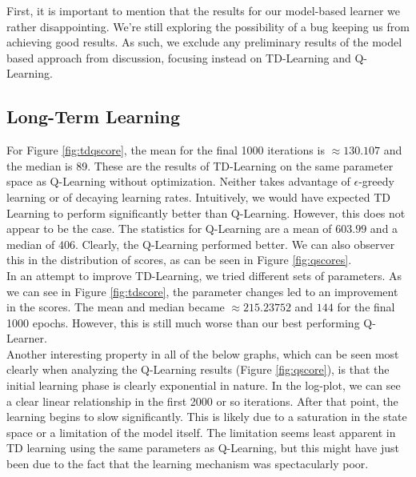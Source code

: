 \documentclass[letterpaper]{article}
\begin{document}
First, it is important to mention that the results for our model-based learner we rather disappointing. We're still exploring the possibility of a bug keeping us from achieving good results. As such, we exclude any preliminary results of the model based approach from discussion, focusing instead on TD-Learning and Q-Learning.

\subsection{Long-Term Learning}
For Figure \ref{fig:tdqscore}, the mean for the final 1000 iterations is $\approx 130.107$ and the median is 89. These are the results of TD-Learning on the same parameter space as Q-Learning without optimization. Neither takes advantage of $\epsilon$-greedy learning or of decaying learning rates. Intuitively, we would have expected TD Learning to perform significantly better than Q-Learning. However, this does not appear to be the case. The statistics for Q-Learning are a mean of $603.99$ and a median of $406$. Clearly, the Q-Learning performed better. We can also observer this in the distribution of scores, as can be seen in Figure \ref{fig:qscores}. \\

In an attempt to improve TD-Learning, we tried different sets of parameters. As we can see in Figure \ref{fig:tdscore}, the parameter changes led to an improvement in the scores. The mean and median became $\approx 215.23752$  and $144$ for the final 1000 epochs. However, this is still much worse than our best performing Q-Learner. \\

Another interesting property in all of the below graphs, which can be seen most clearly when analyzing the Q-Learning results (Figure \ref{fig:qscore}), is that the initial learning phase is clearly exponential in nature. In the log-plot, we can see a clear linear relationship in the first 2000 or so iterations. After that point, the learning begins to slow significantly. This is likely due to a saturation in the state space or a limitation of the model itself. The limitation seems least apparent in TD learning using the same parameters as Q-Learning, but this might have just been due to the fact that the learning mechanism was spectacularly poor.
\end{document}
